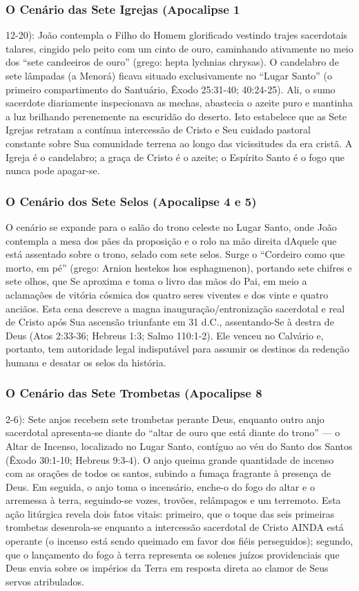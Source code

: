 \documentclass[11pt,a4paper,openany]{book}
\begin{document}
\subsubsection*{O Cenário das Sete Igrejas (Apocalipse 1}
12-20):
João contempla o Filho do Homem glorificado vestindo trajes sacerdotais talares, cingido pelo peito com um cinto de ouro, caminhando ativamente no meio dos ``sete candeeiros de ouro'' (grego: hepta lychnias chrysas). O candelabro de sete lâmpadas (a Menorá) ficava situado exclusivamente no ``Lugar Santo'' (o primeiro compartimento do Santuário, Êxodo 25:31-40; 40:24-25). Ali, o sumo sacerdote diariamente inspecionava as mechas, abastecia o azeite puro e mantinha a luz brilhando perenemente na escuridão do deserto. Isto estabelece que as Sete Igrejas retratam a contínua intercessão de Cristo e Seu cuidado pastoral constante sobre Sua comunidade terrena ao longo das vicissitudes da era cristã. A Igreja é o candelabro; a graça de Cristo é o azeite; o Espírito Santo é o fogo que nunca pode apagar-se.


\subsubsection*{O Cenário dos Sete Selos (Apocalipse 4 e 5)}
O cenário se expande para o salão do trono celeste no Lugar Santo, onde João contempla a mesa dos pães da proposição e o rolo na mão direita dAquele que está assentado sobre o trono, selado com sete selos. Surge o ``Cordeiro como que morto, em pé'' (grego: Arnion hestekos hos esphagmenon), portando sete chifres e sete olhos, que Se aproxima e toma o livro das mãos do Pai, em meio a aclamações de vitória cósmica dos quatro seres viventes e dos vinte e quatro anciãos. Esta cena descreve a magna inauguração/entronização sacerdotal e real de Cristo após Sua ascensão triunfante em 31 d.C., assentando-Se à destra de Deus (Atos 2:33-36; Hebreus 1:3; Salmo 110:1-2). Ele venceu no Calvário e, portanto, tem autoridade legal indisputável para assumir os destinos da redenção humana e desatar os selos da história.


\subsubsection*{O Cenário das Sete Trombetas (Apocalipse 8}
2-6):
Sete anjos recebem sete trombetas perante Deus, enquanto outro anjo sacerdotal apresenta-se diante do ``altar de ouro que está diante do trono'' — o Altar de Incenso, localizado no Lugar Santo, contíguo ao véu do Santo dos Santos (Êxodo 30:1-10; Hebreus 9:3-4). O anjo queima grande quantidade de incenso com as orações de todos os santos, subindo a fumaça fragrante à presença de Deus. Em seguida, o anjo toma o incensário, enche-o do fogo do altar e o arremessa à terra, seguindo-se vozes, trovões, relâmpagos e um terremoto. Esta ação litúrgica revela dois fatos vitais: primeiro, que o toque das seis primeiras trombetas desenrola-se enquanto a intercessão sacerdotal de Cristo AINDA está operante (o incenso está sendo queimado em favor dos fiéis perseguidos); segundo, que o lançamento do fogo à terra representa os solenes juízos providenciais que Deus envia sobre os impérios da Terra em resposta direta ao clamor de Seus servos atribulados.
\end{document}
